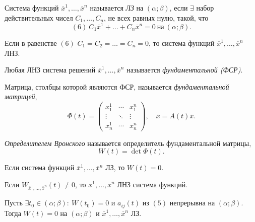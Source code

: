 \begin{definition}[ЛЗ система]
	Система функций $\overline{x} ^1,\ldots ,\overline{x} ^n$ называется \emph{ЛЗ} на $(\alpha ; \beta )$, если $\exists $ набор действительных чисел $C_1,\ldots ,C_n$, не всех равных нулю, такой, что
	\[
		(6) \ C_1\overline{x} ^1 + \ldots + C_n \overline{x} ^n = 0 \ \text{на} \ (\alpha ; \beta ).
	\]
\end{definition}

\begin{definition}
	Если в равенстве $(6)$ $C_1 = C_2 = \ldots = C_n = 0$, то система функций $\overline{x} ^1, \ldots , \overline{x} ^n$ ЛНЗ.
\end{definition}

\begin{definition}
	Любая ЛНЗ система решений $\overline{x} ^1, \ldots , \overline{x} ^n$ называется \emph{фундаментальной (ФСР)}.
\end{definition}

\begin{definition}
	Матрица, столбцы которой являются ФСР, называется \emph{фундаментальной матрицей},
	\[
		\Phi (t) = \left(\begin{array}{ccc}
				x_{1}^{1} & \cdots & x_{1}^{n} \\
				\vdots    & \ddots & \vdots    \\
				x_{n}^{1} & \cdots & x_{n}^{n}
			\end{array}\right), \quad \dot{\overline{x} } = A(t)\overline{x} .
	\]
\end{definition}

\begin{definition}
	\emph{Определителем Вронского} называется определитель фундаментальной матрицы,
	\[
		W(t) = \det \Phi (t).
	\]
\end{definition}

\begin{theorem}
	Если система функций $\overline{x} ^1, \ldots , \overline{x} ^n$ ЛЗ, то $W(t) = 0$.
\end{theorem}

\begin{corollary}
	Если $W_{\overline{x} ^1,\ldots ,\overline{x} ^n} (t) \ne 0$, то $\overline{x} ^1,\ldots ,\overline{x} ^n$ ЛНЗ система функций.
\end{corollary}

\begin{theorem}
	Пусть $\exists t_0 \in (\alpha ; \beta ): \ W(t_0) = 0$ и $a_{ij} (t)$ из $(5)$ непрерывна на $(\alpha ; \beta )$. Тогда $W(t) = 0$ на $(\alpha ; \beta )$ и $\overline{x} ^1,\ldots ,\overline{x} ^n$ ЛЗ.
\end{theorem}

